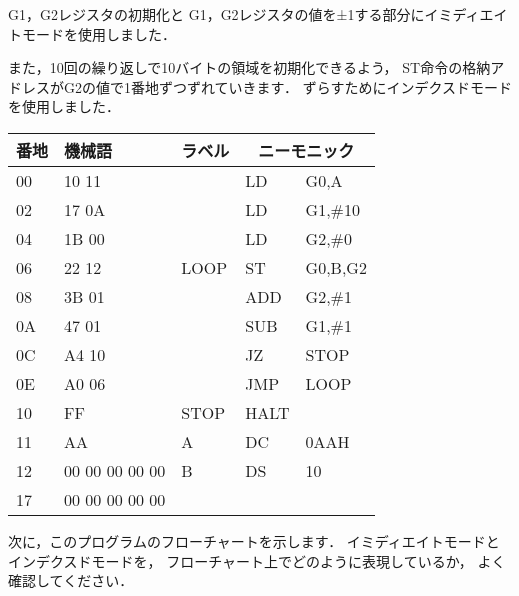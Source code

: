 G1，G2レジスタの初期化と
G1，G2レジスタの値を±1する部分にイミディエイトモードを使用しました．

また，10回の繰り返しで10バイトの領域を初期化できるよう，
ST命令の格納アドレスがG2の値で1番地ずつずれていきます．
ずらすためにインデクスドモードを使用しました．

{\small\tt\begin{center}
\begin{tabular}{|l|l|l|l l|} \hline
番地 & 機械語 & ラベル & \multicolumn{2}{|c|}{ニーモニック} \\
\hline
00 & 10 11 &      & LD   & G0,A          \\
02 & 17 0A &      & LD   & G1,\#10       \\
04 & 1B 00 &      & LD   & G2,\#0        \\
06 & 22 12 & LOOP & ST   & G0,B,G2       \\
08 & 3B 01 &      & ADD  & G2,\#1        \\
0A & 47 01 &      & SUB  & G1,\#1        \\
0C & A4 10 &      & JZ   & STOP          \\
0E & A0 06 &      & JMP  & LOOP          \\
10 & FF    & STOP & HALT &               \\
11 & AA    & A    & DC   & 0AAH          \\
12 & 00 00 00 00 00 & B    & DS   & 10            \\
17 & 00 00 00 00 00 &      &      &               \\
\hline
\end{tabular}
\end{center}}

次に，このプログラムのフローチャートを示します．
イミディエイトモードとインデクスドモードを，
フローチャート上でどのように表現しているか，
よく確認してください．

\begin{center}
\end{center}

